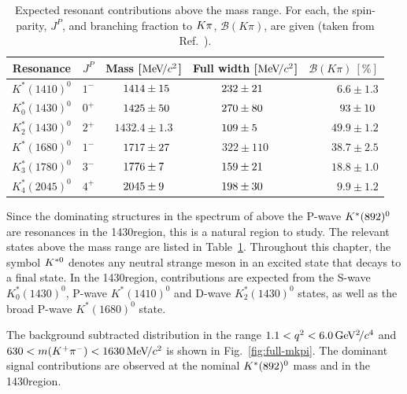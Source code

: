 \begin{table}[!tb]
\caption{Expected resonant contributions above the \KstP mass range. For each, the spin-parity, $J^P$, and branching fraction to ${K}{\pi}$, $\mathcal{B}(K\pi)$, are given (taken from Ref.~\cite{lu-wang}).}
\label{tab:introduction:states}
\centering
\begin{tabular}{c|c|c|c|r}
    Resonance & $J^{P}$ & Mass [$\mathrm{Me\kern -0.1em V\!/}c^2$] & Full width [$\mathrm{Me\kern -0.1em V\!/}c^2$]  & $\mathcal{B}(K\pi)~[\%]$ \\
   \hline
   $K^\ast(1410)^0$ & $1^{-}$& $\hphantom{0.}1414 \pm 15\hphantom{.}$& $232 \pm 21\hphantom{0}$  & $6.6 \pm 1.3$ \\
   $K^\ast_0(1430)^0$ & $0^{+}$ & $\hphantom{0.}1425 \pm 50\hphantom{.}$ & $270 \pm 80\hphantom{0}$ & $\hphantom{.}93 \pm 10\hphantom{.}$ \\
   $K^\ast_2(1430)^0$ & $2^{+}$ & $1432.4\pm 1.3$ & $109 \pm 5\hphantom{00}$ & $49.9 \pm 1.2$ \\
   $K^\ast(1680)^0$ & $1^{-}$ & $\hphantom{0.}1717 \pm 27\hphantom{.}$ & $322 \pm 110$ & $38.7 \pm 2.5$ \\
   $K^\ast_3(1780)^0$ & $3^{-}$ & $\hphantom{0.}1776 \pm 7\hphantom{0.}$ & $159 \pm 21\hphantom{0}$ & $18.8 \pm 1.0$ \\
   $K^\ast_4(2045)^0$ & $4^{+}$ & $\hphantom{0.}2045 \pm 9\hphantom{0.}$ & $198 \pm 30\hphantom{0}$ & $9.9 \pm 1.2$ \\
 \end{tabular}
 \end{table}

Since the dominating structures in the \kpi spectrum of \BdToKpimm above the P-wave ${{K}^*}(892)^{0}$ are resonances in the 1430\mevcc region, this is a natural region to study. The relevant \Kstarz states above the \KstP mass range are listed in Table~\ref{tab:introduction:states}. Throughout this chapter, the symbol ${{K}^{*0}}$ denotes any neutral strange meson in an excited state that decays to a \Kp\pim final state. In the 1430\mevcc region, contributions are expected from the S-wave $K^\ast_0(1430)^0$, P-wave $K^\ast(1410)^0$ and D-wave $K^\ast_2(1430)^0$ states, as well as the broad P-wave $K^\ast(1680)^0$ state. 

The background subtracted \mkpi distribution in the range $1.1<{q^2}<6.0{\mathrm{\,Ge\kern -0.1em V^2\!/}c^4}$ and $630<m({{K}^+}{{\pi}^-})<1630{\mathrm{\,Me\kern -0.1em V\!/}c^2}$ is shown in Fig.~\ref{fig:full-mkpi}. The dominant signal contributions are observed at the nominal ${{K}^*}(892)^{0}$ mass and in the 1430\mevcc region. 

